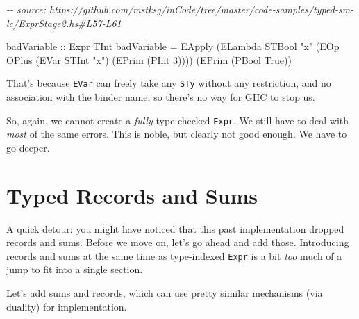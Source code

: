 \documentclass[]{article}
\newenvironment{Shaded}{}{}
\newcommand{\CommentTok}[1]{\textcolor[rgb]{0.38,0.63,0.69}{\textit{#1}}}
\newcommand{\DataTypeTok}[1]{\textcolor[rgb]{0.56,0.13,0.00}{#1}}
\newcommand{\DecValTok}[1]{\textcolor[rgb]{0.25,0.63,0.44}{#1}}
\newcommand{\NormalTok}[1]{#1}
\newcommand{\OtherTok}[1]{\textcolor[rgb]{0.00,0.44,0.13}{#1}}
\newcommand{\StringTok}[1]{\textcolor[rgb]{0.25,0.44,0.63}{#1}}
\begin{document}
\begin{Shaded}
\begin{Highlighting}[]
\CommentTok{{-}{-} source: https://github.com/mstksg/inCode/tree/master/code{-}samples/typed{-}sm{-}lc/ExprStage2.hs\#L57{-}L61}

\OtherTok{badVariable ::} \DataTypeTok{Expr} \DataTypeTok{TInt}
\NormalTok{badVariable }\OtherTok{=}
  \DataTypeTok{EApply}
\NormalTok{    (}\DataTypeTok{ELambda} \DataTypeTok{STBool} \StringTok{"x"}\NormalTok{ (}\DataTypeTok{EOp} \DataTypeTok{OPlus}\NormalTok{ (}\DataTypeTok{EVar} \DataTypeTok{STInt} \StringTok{"x"}\NormalTok{) (}\DataTypeTok{EPrim}\NormalTok{ (}\DataTypeTok{PInt} \DecValTok{3}\NormalTok{))))}
\NormalTok{    (}\DataTypeTok{EPrim}\NormalTok{ (}\DataTypeTok{PBool} \DataTypeTok{True}\NormalTok{))}
\end{Highlighting}
\end{Shaded}

That's because \texttt{EVar} can freely take any \texttt{STy} without any
restriction, and no association with the binder name, so there's no way for GHC
to stop us.

So, again, we cannot create a \emph{fully} type-checked \texttt{Expr}. We still
have to deal with \emph{most} of the same errors. This is noble, but clearly not
good enough. We have to go deeper.

\section{Typed Records and Sums}\label{typed-records-and-sums}

A quick detour: you might have noticed that this past implementation dropped
records and sums. Before we move on, let's go ahead and add those. Introducing
records and sums at the same time as type-indexed \texttt{Expr} is a bit
\emph{too} much of a jump to fit into a single section.

Let's add sums and records, which can use pretty similar mechanisms (via
duality) for implementation.
\end{document}
